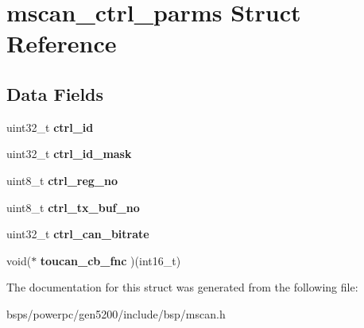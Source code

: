\hypertarget{structmscan__ctrl__parms}{}\section{mscan\+\_\+ctrl\+\_\+parms Struct Reference}
\label{structmscan__ctrl__parms}
\subsection*{Data Fields}
\begin{DoxyCompactItemize}
\item 
\mbox{\label{structmscan__ctrl__parms_a59deec698705edebb6c24d72ce844a4b}} 
uint32\+\_\+t {\bfseries ctrl\+\_\+id}
\item 
\mbox{\label{structmscan__ctrl__parms_a811d7bf3ff33d65627d384aeebcf1a18}} 
uint32\+\_\+t {\bfseries ctrl\+\_\+id\+\_\+mask}
\item 
\mbox{\label{structmscan__ctrl__parms_afce0d7d8573c4b3d1ab9b7ab2ba74ee1}} 
uint8\+\_\+t {\bfseries ctrl\+\_\+reg\+\_\+no}
\item 
\mbox{\label{structmscan__ctrl__parms_a7c6fa99db0e4a473af9b4e1e3babd222}} 
uint8\+\_\+t {\bfseries ctrl\+\_\+tx\+\_\+buf\+\_\+no}
\item 
\mbox{\label{structmscan__ctrl__parms_a6477072ec4dcbf7340ee099e8b375d76}} 
uint32\+\_\+t {\bfseries ctrl\+\_\+can\+\_\+bitrate}
\item 
\mbox{\label{structmscan__ctrl__parms_a2b25f187a8f6d75f4e761f68f9420c50}} 
void($\ast$ {\bfseries toucan\+\_\+cb\+\_\+fnc} )(int16\+\_\+t)
\end{DoxyCompactItemize}


The documentation for this struct was generated from the following file\+:\begin{DoxyCompactItemize}
\item 
bsps/powerpc/gen5200/include/bsp/mscan.\+h\end{DoxyCompactItemize}
